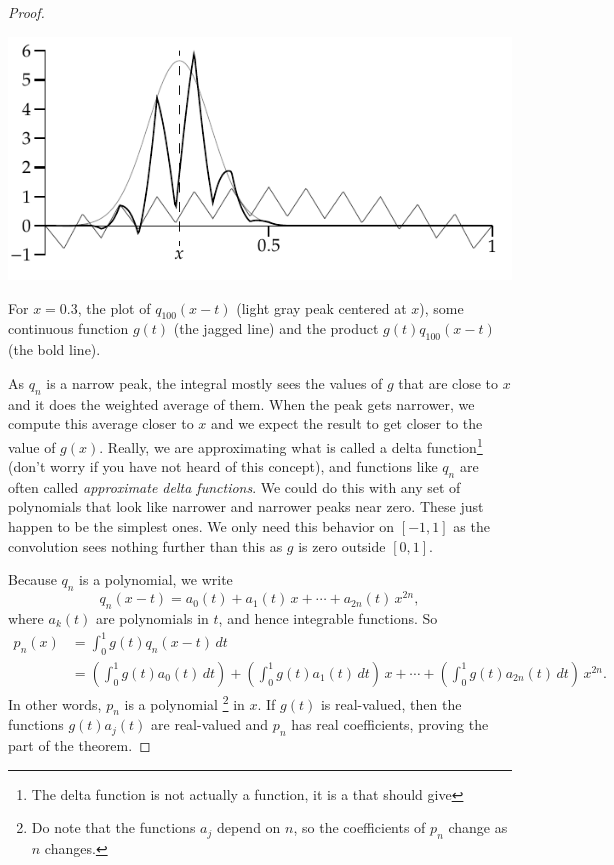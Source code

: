 \begin{proof}
\begin{myfigureht}
\includegraphics{figures/approxdeltaconv}
\caption{For $x=0.3$, the plot of $q_{100}(x-t)$ (light gray peak centered
at $x$), some continuous function
$g(t)$ (the jagged line) and the product $g(t)q_{100}(x-t)$ (the bold line).\label{fig:approxdeltaconv}}
\end{myfigureht}

As $q_n$ is a narrow peak, the integral
mostly sees the values of $g$ that are
close to $x$ and it does the weighted average of them.
When the peak gets narrower, we compute this average closer to $x$
and we expect the result to get closer to the value of $g(x)$.  Really, we are
approximating what is called a delta function\footnote{The delta function
is not actually a function,
it is a  that should give
}
(don't worry if you have not
heard of this concept),
and functions like $q_n$ are often called
\emph{approximate delta functions}.
We could do this with any set of polynomials that look like narrower
and narrower peaks near zero.  These just happen to be the simplest ones.
We only need this behavior on $[-1,1]$ as the convolution sees nothing
further than this as $g$ is zero outside $[0,1]$.

Because $q_n$ is a polynomial, we write
\begin{equation*}
q_n(x-t) = a_0(t) + a_1(t)\,x + \cdots + a_{2n}(t)\, x^{2n} ,
\end{equation*}
where $a_k(t)$ are polynomials in $t$, and hence
integrable functions.
So
\begin{equation*}
\begin{split}
p_n(x) & =
\int_{0}^1 g(t)q_n(x-t) \,dt
\\
&=
\left(
\int_0^1
g(t)
a_0(t)\,dt
\right)
+
\left(
\int_0^1
g(t)
a_1(t)\,dt
\right)
\,
x
+
\cdots
+
\left(
\int_0^1
g(t)
a_{2n}(t)\,dt
\right)
\,
x^{2n} .
\end{split}
\end{equation*}
In other words, $p_n$ is a polynomial%
\footnote{%
Do note that the functions $a_j$ depend on $n$, so the coefficients of $p_n$
change as $n$ changes.}
 in $x$.
If $g(t)$ is real-valued, then the functions $g(t)a_j(t)$ are
real-valued and $p_n$ has real coefficients,
proving the  part of the theorem.


\end{proof}
